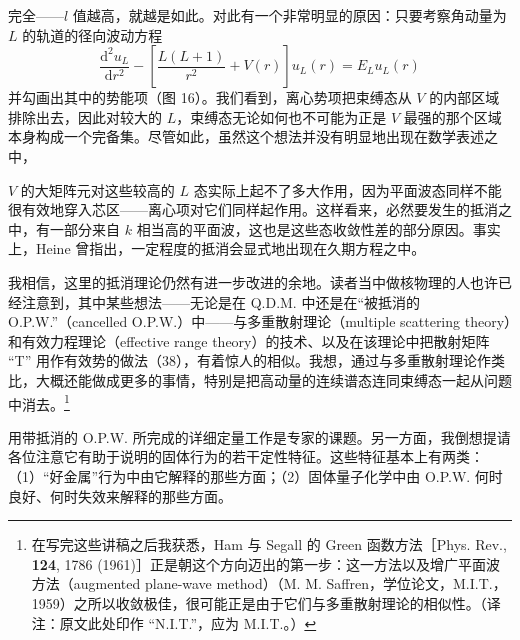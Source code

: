 

完全——$l$ 值越高，就越是如此。对此有一个非常明显的原因：只要考察角动量为 $L$ 的轨道的径向波动方程
\begin{equation*}
\frac{\mathrm{d}^2 u_L}{\mathrm{d}r^2} - \left[\frac{L(L+1)}{r^2} + V(r)\right] u_L(r) = E_L u_L(r)
\end{equation*}
并勾画出其中的势能项（图 16）。我们看到，离心势项把束缚态从 $V$ 的内部区域排除出去，因此对较大的 $L$，束缚态无论如何也不可能为正是 $V$ 最强的那个区域本身构成一个完备集。尽管如此，虽然这个想法并没有明显地出现在数学表述之中，


$V$ 的大矩阵元对这些较高的 $L$ 态实际上起不了多大作用，因为平面波态同样不能很有效地穿入芯区——离心项对它们同样起作用。这样看来，必然要发生的抵消之中，有一部分来自 $k$ 相当高的平面波，这也是这些态收敛性差的部分原因。事实上，Heine 曾指出，一定程度的抵消会显式地出现在久期方程之中。

我相信，这里的抵消理论仍然有进一步改进的余地。读者当中做核物理的人也许已经注意到，其中某些想法——无论是在 Q.D.M. 中还是在“被抵消的 O.P.W.”（cancelled O.P.W.）中——与多重散射理论（multiple scattering theory）和有效力程理论（effective range theory）的技术、以及在该理论中把散射矩阵 “T” 用作有效势的做法（38），有着惊人的相似。我想，通过与多重散射理论作类比，大概还能做成更多的事情，特别是把高动量的连续谱态连同束缚态一起从问题中消去。\footnote{在写完这些讲稿之后我获悉，Ham 与 Segall 的 Green 函数方法［Phys. Rev., \textbf{124}, 1786 (1961)］正是朝这个方向迈出的第一步：这一方法以及增广平面波方法（augmented plane-wave method）（M. M. Saffren，学位论文，M.I.T.，1959）之所以收敛极佳，很可能正是由于它们与多重散射理论的相似性。（译注：原文此处印作 “N.I.T.”，应为 M.I.T.。）}

用带抵消的 O.P.W. 所完成的详细定量工作是专家的课题。另一方面，我倒想提请各位注意它有助于说明的固体行为的若干定性特征。这些特征基本上有两类：（1）“好金属”行为中由它解释的那些方面；（2）固体量子化学中由 O.P.W. 何时良好、何时失效来解释的那些方面。

